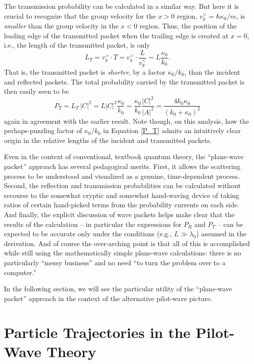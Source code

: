 \documentclass[aps,prc,twocolumn,letterpaper,floatfix]{revtex4}
\begin{document}
The transmission probability
can be calculated in a similar way.  But here it is crucial to recognize
that the group velocity for the $x>0$ region, $v_g^> = \hbar \kappa_0
/ m$, is \emph{smaller} than the group velocity in the $x<0$ region.
Thus, the position of the leading edge of the transmitted packet when
the trailing edge is created at $x=0$, i.e., the length of the
transmitted packet, is only
\begin{equation}
L_T = v_g^> \cdot T = v_g^> \cdot \frac{L}{v_g^<} = L \frac{\kappa_0}{k_0}.
\end{equation}
That is, the transmitted packet is \emph{shorter}, by a factor
$\kappa_0/k_0$, than the incident and reflected packets.  The total
probability carried by the transmitted packet is then easily seen to
be
\begin{equation}
P_T = L_T \, |C|^2 = L |C|^2 \frac{\kappa_0}{k_0} =
\frac{\kappa_0}{k_0} \frac{|C|^2}{|A|^2} =
\frac{4 k_0
  \kappa_0}{(k_0+\kappa_0)^2}
\end{equation}
again in agreement with the earlier result.  Note though, on this
analysis, how the perhaps-puzzling factor of $\kappa_0 / k_0$ in
Equation \eqref{P_T} admits an intuitively clear origin in the relative
lengths of the incident and transmitted packets.  

Even in the context of conventional, textbook quantum theory, the
``plane-wave packet'' approach has several pedagogical merits.  First,
it allows the scattering process to be understood and visualized as a 
genuine, time-dependent process.  Second, the reflection and
transmission probabilities can be calculated without recourse to the
somewhat cryptic and somewhat hand-waving device of taking ratios of
certain hand-picked terms from the probability currents on each side.
And finally, the explicit discussion of wave packets helps make clear
that the results of the calculation -- in particular the expressions
for $P_R$ and $P_T$ -- can be expected to be accurate only under the
conditions (e.g., $L \gg \lambda_0$) assumed in the derivation.  And
of course the over-arching point is that all of this is accomplished
while still using the mathematically simple plane-wave calculations:
there is no particularly ``messy business'' and no need ``to turn
the problem over to a computer.''

In the following section, we will see the particular utility of the
``plane-wave packet'' approach in the context of the alternative pilot-wave
picture.

\section{Particle Trajectories in the Pilot-Wave Theory}
\end{document}
